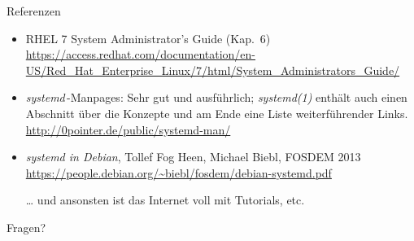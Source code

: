 \begin{frame}{Referenzen}
  \small
  \begin{itemize}
    \item RHEL 7 System Administrator's Guide
    (Kap.~6)\\ \url{https://access.redhat.com/documentation/en-US/Red_Hat_Enterprise_Linux/7/html/System_Administrators_Guide/}

    \item \emph{systemd}\,-Manpages: Sehr gut und ausführlich;
    \emph{systemd(1)} enthält auch einen Abschnitt über die Konzepte und
    am Ende eine Liste weiterführender Links.\\
    \url{http://0pointer.de/public/systemd-man/}
    \item \emph{systemd in Debian}, Tollef Fog Heen, Michael Biebl,
    FOSDEM 2013\\
    \url{https://people.debian.org/~biebl/fosdem/debian-systemd.pdf}
    
    \item[\dots] und ansonsten ist das Internet voll mit Tutorials, etc.
  \end{itemize}
\end{frame}


\begin{frame}[plain]
  \centerline{\Huge Fragen?}
\end{frame}




